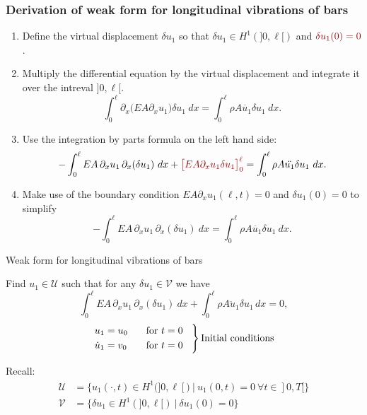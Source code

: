 \documentclass[aspectratio=169]{beamer}
\begin{document}
\begin{frame}
  \small
  \frametitle{Derivation of weak form for longitudinal vibrations of bars}
  \begin{enumerate}
    \item Define the virtual displacement $\delta u_{1}$ so that $\delta u_{1}\in H^{1}(]0,\ell[)$ and ${\color{darkred}\delta u_{1}(0)=0}$.
    \item Multiply the differential equation by the virtual displacement and integrate it over the intreval $]0,\ell[$.
          $$\int_0^\ell \partial_x\big(EA \partial_x u_1\big)\delta u_1\ dx=\int_0^\ell\rho A \ddot{u_1}\delta u_1\ dx.$$
    \item Use the integration by parts formula on the left hand side:
          $$-\int_0^\ell EA\, \partial_{x} u_1\,\partial_{x}(\delta u_1)\ dx+{\color{darkred}\big[EA \partial_{x} u_1\delta u_1\big]_0^\ell}=\int_0^\ell\rho A \ddot{u_1}\delta u_1\ dx.$$
    \item Make use of the boundary condition $EA\partial_{x}u_1(\ell,t) = 0$ and $\delta u_{1}(0)=0$ to simplify
          $$-\int_0^\ell EA\, \partial_{x} u_1\,\partial_{x}(\delta u_1)\ dx =\int_0^\ell\rho A \ddot{u_1}\delta u_1\ dx.$$
  \end{enumerate}
\end{frame}

\begin{frame}{Weak form for longitudinal vibrations of bars}
  \begin{block}{}
    Find $u_{1}\in \mathcal U$ such that for any $\delta u_1\in\mathcal V$ we have
    \[
      \int_0^\ell EA\, \partial_{x} u_1\,\partial_{x}(\delta u_1)\ dx +\int_0^\ell\rho A \ddot{u}_1\delta u_1\, dx=0,
    \]
    {\small$$\begin{rcases}\begin{aligned}
           & u_1=u_0\hspace{0.3cm}        & \text{for } t=0 \hspace{0.3cm} \\
           & {\dot u}_1=v_0\hspace{0.3cm} & \text{for } t=0\hspace{0.3cm}
        \end{aligned}
      \end{rcases}\text{Initial conditions}$$}
  \end{block}

  Recall:
  \begin{align*}
    \mathcal U & =\big\{u_{1}(\cdot,t)\in H^1(]0,\ell[)\ |\  u_1(0,t)=0\ \forall t\in]0,T[\big\} \\
    \mathcal V & =\big\{\delta u_{1}\in H^1(]0,\ell[)\ |\ \delta u_{1}(0)=0\big\}
  \end{align*}
\end{frame}
\end{document}
